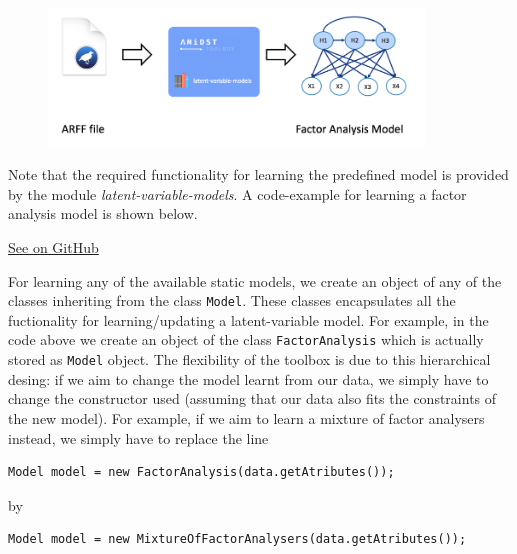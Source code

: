 \documentclass[10pt,a4paper]{article}
\begin{document}
\begin{figure}[h!]
	\centering
	\includegraphics[width=10cm]{img/staticlearning.png}
	\label{fig:lvmodels:static:learning:scheme}	
\end{figure}


Note that the required functionality for learning the predefined model is provided by the module \textit{latent-variable-models}. A code-example for learning a factor analysis model is shown below.



\href{https://github.com/amidst/tutorial/blob/master/src/main/java/eu/amidst/tutorial/usingAmidst/examples/StaticModelLearning.java}{See on GitHub}
\vspace{3mm}


For learning any of the available static models, we create an object of any of the classes inheriting from the class \texttt{Model}. These classes encapsulates all the fuctionality for learning/updating a latent-variable model. For example, in the code above we create an object of the class \texttt{FactorAnalysis} which is actually stored as \texttt{Model} object. The flexibility of the toolbox is due to this hierarchical desing: if we aim to change the model learnt from our data, we simply have to change the constructor used (assuming that our data also fits the constraints of the new model). For example, if we aim to learn a mixture of factor analysers instead, we simply have to replace the line 

\begin{verbatim}
Model model = new FactorAnalysis(data.getAtributes());
\end{verbatim}

\noindent by

\begin{verbatim}
Model model = new MixtureOfFactorAnalysers(data.getAtributes());
\end{verbatim}
\end{document}
